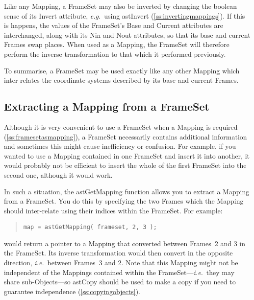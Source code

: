 \documentclass[twoside,11pt]{article}
\newcommand{\htmlref}[2]{#1}
\newcommand{\secref}[1]{\S\ref{#1}}
\renewcommand{\secref}[1]{\ref{#1}}
\begin{document}
Like any Mapping, a FrameSet may also be inverted by changing the
boolean sense of its \htmlref{Invert}{Invert} attribute, {\em{e.g.}}\ using \htmlref{astInvert}{astInvert}
(\secref{ss:invertingmappings}). If this is happens, the values of the
FrameSet's \htmlref{Base}{Base} and \htmlref{Current}{Current} attributes are interchanged, along with
its Nin and Nout attributes, so that its base and current Frames swap
places. When used as a Mapping, the FrameSet will therefore perform
the inverse transformation to that which it performed previously.

To summarise, a FrameSet may be used exactly like any other Mapping
which inter-relates the coordinate systems described by its base and
current Frames.

\subsection{\label{ss:extractingamapping}Extracting a Mapping from a FrameSet}

Although it is very convenient to use a \htmlref{FrameSet}{FrameSet} when a \htmlref{Mapping}{Mapping} is
required (\secref{ss:framesetasmapping}), a FrameSet necessarily
contains additional information and sometimes this might cause
inefficiency or confusion.  For example, if you wanted to use a
Mapping contained in one FrameSet and insert it into another, it would
probably not be efficient to insert the whole of the first FrameSet
into the second one, although it would work.

In such a situation, the \htmlref{astGetMapping}{astGetMapping} function allows you to extract
a Mapping from a FrameSet. You do this by specifying the two Frames
which the Mapping should inter-relate using their indices within the
FrameSet. For example:

\begin{quote}
\small
\begin{verbatim}
map = astGetMapping( frameset, 2, 3 );
\end{verbatim}
\normalsize
\end{quote}

would return a pointer to a Mapping that converted between Frames~2
and 3 in the FrameSet. Its inverse transformation would then convert
in the opposite direction, {\em{i.e.}}\ between Frames~3 and 2.  Note
that this Mapping might not be independent of the Mappings contained
within the FrameSet---{\em{i.e.}}\ they may share sub-Objects---so
\htmlref{astCopy}{astCopy} should be used to make a copy if you need to guarantee
independence (\secref{ss:copyingobjects}).
\end{document}
